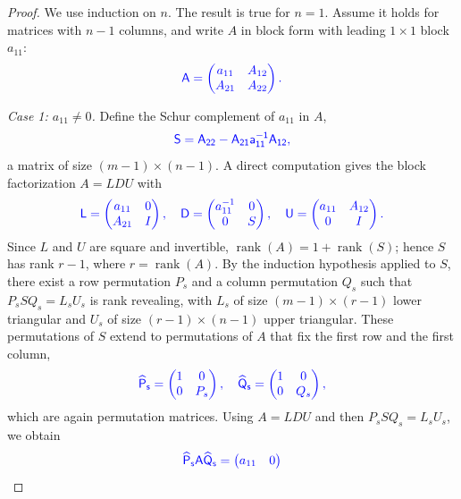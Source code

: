 \documentclass[10pt,twoside]{siamart1116}
\DeclareMathOperator{\rk}{rank}
\newcommand{\by}{\times}
\numberwithin{theorem}{section}
\providecommand{\DIFadd}[1]{{\protect\color{blue} \sf #1}} %
\begin{document}
\begin{proof}
  \DIFadd{We use induction on $n$. The result is true for $n=1$. Assume it holds for matrices with $n-1$ columns, and write $A$ in block form with leading $1 \times 1$ block $a_{11}$:
  }\[
    \DIFadd{A =
    \begin{pmatrix}
      a_{11} & A_{12} \\
      A_{21} & A_{22}
    \end{pmatrix}.
  }\]

  \DIFadd{\emph{Case 1: $a_{11} \neq 0$.} Define the Schur complement of $a_{11}$ in $A$,
  }\[
    \DIFadd{S = A_{22} - A_{21} a_{11}^{-1} A_{12},
  }\]
  \DIFadd{a matrix of size $(m-1) \by (n-1)$. A direct computation gives the block factorization $A = LDU$ with
  }\[
    \DIFadd{L =
    \begin{pmatrix}
      a_{11} & 0 \\
      A_{21} & I
    \end{pmatrix}, \quad
    D =
    \begin{pmatrix}
      a_{11}^{-1} & 0 \\
      0           & S
    \end{pmatrix}, \quad
    U =
    \begin{pmatrix}
      a_{11} & A_{12} \\
      0      & I
    \end{pmatrix}.
  }\]
  \DIFadd{Since $L$ and $U$ are square and invertible, $\rk(A) = 1 + \rk(S)$; hence $S$ has rank $r-1$, where $r = \rk(A)$. By the induction hypothesis applied to $S$, there exist a row permutation $P_s$ and a column permutation $Q_s$ such that $P_s S Q_s = L_s U_s$ is rank revealing, with $L_s$ of size $(m-1) \by (r-1)$ lower triangular and $U_s$ of size $(r-1) \by (n-1)$ upper triangular. These permutations of $S$ extend to permutations of $A$ that fix the first row and the first column,
  }\[
    \DIFadd{\widehat{P}_s =
    \begin{pmatrix}
      1 & 0   \\
      0 & P_s
    \end{pmatrix}, \quad
    \widehat{Q}_s =
    \begin{pmatrix}
      1 & 0   \\
      0 & Q_s
    \end{pmatrix},
  }\]
  \DIFadd{which are again permutation matrices. Using $A = LDU$ and then $P_s S Q_s = L_s U_s$, we obtain
  }\[
    \DIFadd{\widehat{P}_s A \widehat{Q}_s
    =
    \begin{pmatrix}
      a_{11}     & 0 \\

\end{pmatrix}}\]
\end{proof}
\end{document}
